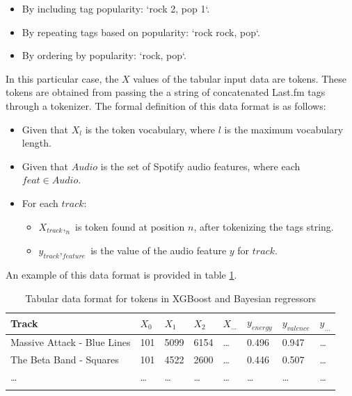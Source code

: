 \documentclass[sn-mathphys]{sn-jnl}%
\theoremstyle{thmstyleone}%
\theoremstyle{thmstyletwo}%
\theoremstyle{thmstylethree}%
\begin{document}
\begin{itemize}
      \item By including tag popularity: `rock 2, pop 1`.
      \item By repeating tags based on popularity: `rock rock, pop`.
      \item By ordering by popularity: `rock, pop`.
\end{itemize}


In this particular case, the $X$ values of the tabular input data are tokens.
These tokens are obtained from passing the a string of concatenated Last.fm tags through a tokenizer.
The formal definition of this data format is as follows:

\begin{itemize}
      \item Given that $X_l$ is the token vocabulary, where $l$ is the maximum vocabulary length.
      \item Given that $Audio$ is the set of Spotify audio features, where each $feat \in Audio$.
      \item For each $track$:
      \begin{itemize}
            \item $X_{track},_{n}$ is token found at position $n$, after tokenizing the tags string.
            \item $y_{track},_{feature}$ is the value of the audio feature $y$ for $track$.
      \end{itemize}
\end{itemize}

An example of this data format is provided in table \ref{tabular_token_format}.

\begin{table}[h]
      \begin{center}
      \begin{minipage}{\textwidth}
      \caption{Tabular data format for tokens in XGBoost and Bayesian regressors}\label{tabular_token_format}%
      \begin{tabular}{@{}llllllll@{}}
      \toprule
      Track                         & $X_{0}$ & $X_{1}$ & $X_{2}$ & $X_{\dots}$ & $y_{energy}$ & $y_{valence}$ & $y_{\dots}$ \\
      \midrule
      Massive Attack - Blue Lines   & 101     & 5099    & 6154    &  \dots      & 0.496        & 0.947         &  \dots  \\
      The Beta Band - Squares       & 101     & 4522    & 2600    &  \dots      & 0.446        & 0.507         &  \dots  \\
      \dots                         & \dots   & \dots   & \dots   &  \dots      & \dots        & \dots         &  \dots  \\
      \botrule
      \end{tabular}
      \end{minipage}
      \end{center}
\end{table}
\end{document}
